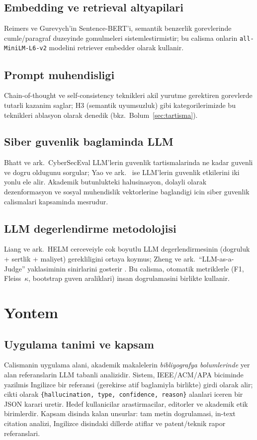 \documentclass[11pt,a4paper]{article}
\begin{document}
\subsection{Embedding ve retrieval altyapilari}
Reimers ve Gurevych'in \cite{reimers2019sbert} Sentence-BERT'i, semantik
benzerlik gorevlerinde cumle/paragraf duzeyinde gomulmeleri sistemlestirmistir;
bu calisma onlarin \texttt{all-MiniLM-L6-v2} modelini retriever embedder olarak
kullanir.

\subsection{Prompt muhendisligi}
Chain-of-thought \cite{wei2022cot} ve self-consistency \cite{wang2023selfconsistency}
teknikleri akil yurutme gerektiren gorevlerde tutarli kazanim saglar; H3
(semantik uyumsuzluk) gibi kategorilerimizde bu teknikleri ablasyon olarak
denedik (bkz.~Bolum~\ref{sec:tartisma}).

\subsection{Siber guvenlik baglaminda LLM}
Bhatt ve ark.\ CyberSecEval \cite{bhatt2023cyberseceval} LLM'lerin guvenlik
tartismalarinda ne kadar guvenli ve dogru oldugunu sorgular; Yao ve ark.\
\cite{yao2024survey} ise LLM'lerin guvenlik etkilerini iki yonlu ele alir.
Akademik butunlukteki halusinasyon, dolayli olarak dezenformasyon ve sosyal
muhendislik vektorlerine baglandigi icin siber guvenlik calismalari kapsaminda
mesrudur.

\subsection{LLM degerlendirme metodolojisi}
Liang ve ark.\ HELM cerceveiyle \cite{liang2023helm} cok boyutlu LLM
degerlendirmesinin (dogruluk + sertlik + maliyet) gerekliligini ortaya koymus;
Zheng ve ark.\ ``LLM-as-a-Judge'' yaklasiminin sinirlarini gosterir
\cite{zheng2023judging}. Bu calisma, otomatik metriklerle (F1, Fleiss~$\kappa$,
bootstrap guven araliklari) insan dogrulamasini birlikte kullanir.

\section{Yontem}
\label{sec:yontem}

\subsection{Uygulama tanimi ve kapsam}
Calismanin uygulama alani, akademik makalelerin \emph{bibliyografya bolumlerinde}
yer alan referanslarin LLM tabanli analizidir. Sistem, IEEE/ACM/APA biciminde
yazilmis Ingilizce bir referansi (gerekirse atif baglamiyla birlikte) girdi
olarak alir; cikti olarak \texttt{\{hallucination, type, confidence, reason\}}
alanlari iceren bir JSON karari uretir. Hedef kullanicilar arastirmacilar,
editorler ve akademik etik birimlerdir. Kapsam disinda kalan unsurlar: tam
metin dogrulamasi, in-text citation analizi, Ingilizce disindaki dillerde
atiflar ve patent/teknik rapor referanslari.
\end{document}
